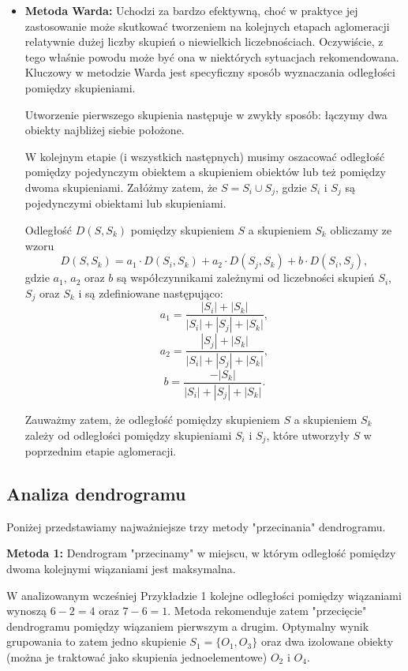 \documentclass{article}
\begin{document}
\begin{itemize}
    \item \textbf{Metoda Warda:} Uchodzi za bardzo efektywną, choć w praktyce jej zastosowanie może skutkować tworzeniem na kolejnych etapach aglomeracji relatywnie dużej liczby skupień o niewielkich liczebnościach. Oczywiście, z tego właśnie powodu może być ona w niektórych sytuacjach rekomendowana. Kluczowy w metodzie Warda jest specyficzny sposób wyznaczania odległości pomiędzy skupieniami.
    
    Utworzenie pierwszego skupienia następuje w zwykły sposób: łączymy dwa obiekty najbliżej siebie położone.
    
    W kolejnym etapie (i wszystkich następnych) musimy oszacować odległość pomiędzy pojedynczym obiektem a skupieniem obiektów lub też pomiędzy dwoma skupieniami. Załóżmy zatem, że $S = S_i \cup S_j$, gdzie $S_i$ i $S_j$ są pojedynczymi obiektami lub skupieniami.
    
    Odległość $D(S, S_k)$ pomiędzy skupieniem $S$ a skupieniem $S_k$ obliczamy ze wzoru
    \begin{equation}
        D(S, S_k) = a_1 \cdot D(S_i, S_k) + a_2 \cdot D(S_j , S_k) + b \cdot D(S_i, S_j), \tag{3}
    \end{equation}
    gdzie $a_1$, $a_2$ oraz $b$ są współczynnikami zależnymi od liczebności skupień $S_i$, $S_j$ oraz $S_k$ i są zdefiniowane następująco:
    \[ a_1 = \frac{|S_i| + |S_k|}{|S_i| + |S_j| + |S_k|}, \]
    \[ a_2 = \frac{|S_j| + |S_k|}{|S_i| + |S_j| + |S_k|}, \]
    \[ b = \frac{-|S_k|}{|S_i| + |S_j| + |S_k|}. \]
    
    Zauważmy zatem, że odległość pomiędzy skupieniem $S$ a skupieniem $S_k$ zależy od odległości pomiędzy skupieniami $S_i$ i $S_j$, które utworzyły $S$ w poprzednim etapie aglomeracji.
\end{itemize}

\subsection{Analiza dendrogramu}

Poniżej przedstawiamy najważniejsze trzy metody "przecinania" dendrogramu.

\textbf{Metoda 1:} Dendrogram "przecinamy" w miejscu, w którym odległość pomiędzy dwoma kolejnymi wiązaniami jest maksymalna.

W analizowanym wcześniej Przykładzie 1 kolejne odległości pomiędzy wiązaniami wynoszą $6 - 2 = 4$ oraz $7 - 6 = 1$. Metoda rekomenduje zatem "przecięcie" dendrogramu pomiędzy wiązaniem pierwszym a drugim. Optymalny wynik grupowania to zatem jedno skupienie $S_1 = \{O_1, O_3\}$ oraz dwa izolowane obiekty (można je traktować jako skupienia jednoelementowe) $O_2$ i $O_4$.
\end{document}
